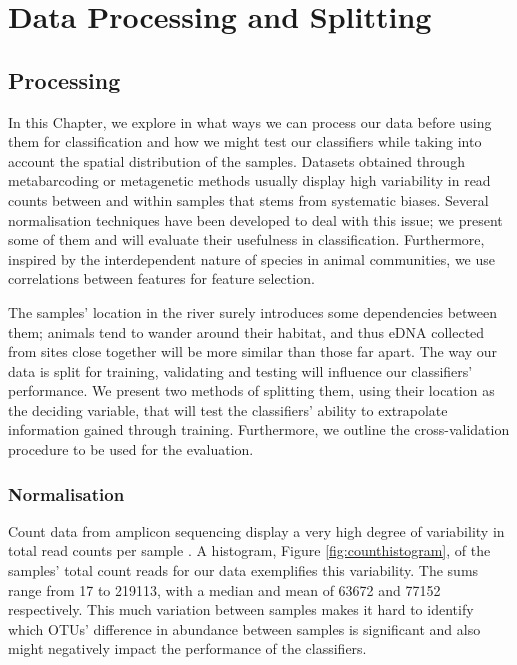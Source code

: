 
\chapter{Data Processing and Splitting}
\label{chap:data}
\ifpdf
    \graphicspath{{DataChapter/Figs/Raster/}{DataChapter/Figs/PDF/}{DataChapter/Figs/}}
\else
    \graphicspath{{DataChapter/Figs/Vector/}{DataChapter/Figs/}}
\fi



\section{Processing}

In this Chapter, we explore in what ways we can process our data before using them for classification and how we might test our classifiers while taking into account the spatial distribution of the samples. Datasets obtained through metabarcoding or metagenetic methods usually display high variability in read counts between and within samples that stems from systematic biases. Several normalisation techniques have been developed to deal with this issue; we present some of them and  will evaluate their usefulness in classification. Furthermore, inspired by the interdependent nature of species in animal communities, we use correlations between features for feature selection.


The samples' location in the river surely introduces some dependencies between them; animals tend to wander around their habitat, and thus eDNA collected from sites close together will be more similar than those far apart. The way our data is split for training, validating and testing will influence our classifiers' performance. We present two methods of splitting them, using their location as the deciding variable, that will test the classifiers' ability to extrapolate information gained through training. Furthermore, we outline the cross-validation procedure to be used for the evaluation.
\subsection{Normalisation}

Count data from amplicon sequencing display a very high degree of variability in total read counts per sample \cite{inadmissible_rareying}. A histogram, Figure \ref{fig:counthistogram}, of the samples' total count reads for our data exemplifies this variability. The sums range from 17 to 219113, with a median and mean of 63672 and 77152 respectively. This much variation between samples makes it hard to identify which OTUs' difference in abundance between samples is significant and also might negatively impact the performance of the classifiers. 
 

